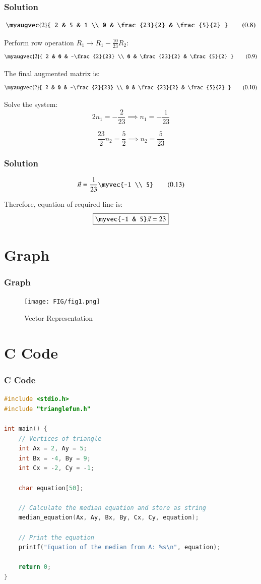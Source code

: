 \documentclass{beamer}
\numberwithin{equation}{section}
\begin{document}
\begin{frame}[fragile]
    \frametitle{Solution}
\[
\myaugvec{2}{
2 & 5 & 1 \\
0 & \frac{23}{2} & \frac{5}{2}
}
\tag{0.8}
\]

Perform row operation \(R_1 \to R_1 - \frac{10}{23} R_2\):
\[
\myaugvec{2}{
2 & 0 & -\frac{2}{23} \\
0 & \frac{23}{2} & \frac{5}{2}
}
\tag{0.9}
\]

The final augmented matrix is:
\[
\myaugvec{2}{
2 & 0 & -\frac{2}{23} \\
0 & \frac{23}{2} & \frac{5}{2}
}
\tag{0.10}
\]

Solve the system:
\[
2 n_1 = -\frac{2}{23} \implies n_1 = -\frac{1}{23}
\tag{0.11}
\]

\[
\frac{23}{2} n_2 = \frac{5}{2} \implies n_2 = \frac{5}{23}
\tag{0.12}
\]

\end{frame}
\begin{frame}[fragile]
    \frametitle{Solution}

\[
\vec{n} = \frac{1}{23} \myvec{-1 \\ 5}
\tag{0.13}
\]

Therefore, equation of required line is:
\[
\boxed{
\myvec{-1 & 5} \vec{x} = 23
}
\]


\end{frame}
\section{Graph}
\begin{frame}
    \frametitle{Graph}
    \begin{figure}[htbp]
    \centering
    \texttt{[image: FIG/fig1.png]}
    \caption{Vector Representation}
    \label{fig:FIG/fig1.png}
\end{figure}
\end{frame}
\section{ C Code}
\begin{frame}[fragile]
\frametitle{C Code }
\begin{lstlisting}[language=C]
#include <stdio.h>
#include "trianglefun.h"

int main() {
    // Vertices of triangle
    int Ax = 2, Ay = 5;
    int Bx = -4, By = 9;
    int Cx = -2, Cy = -1;

    char equation[50];

    // Calculate the median equation and store as string
    median_equation(Ax, Ay, Bx, By, Cx, Cy, equation);

    // Print the equation
    printf("Equation of the median from A: %s\n", equation);

    return 0;
}



    
\end{lstlisting}
\end{frame}
\end{document}
